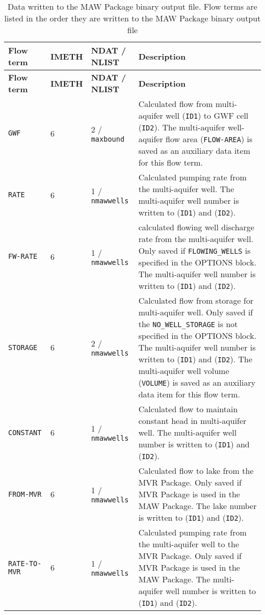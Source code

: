 \newpage
\begin{longtable}{p{3.5cm} p{2cm} p{3.5cm} p{6.5cm}}
\caption{Data written to the MAW Package binary output file. Flow terms are listed in the order they are written to the MAW Package binary output file} \tabularnewline
\hline
\hline
\textbf{Flow term} & \textbf{IMETH} & \textbf{NDAT / NLIST} & \textbf{Description} \\
\hline
\endfirsthead

\hline
\hline
\textbf{Flow term} & \textbf{IMETH} & \textbf{NDAT / NLIST} & \textbf{Description} \\
\hline
\endhead

\hline
\endfoot

\texttt{GWF} & 6 & 2 / \texttt{maxbound} & Calculated flow from multi-aquifer well (\texttt{ID1}) to GWF cell (\texttt{ID2}). The multi-aquifer well-aquifer flow area (\texttt{FLOW-AREA}) is saved as an auxiliary data item for this flow term.\\
\texttt{RATE} & 6 & 1 / \texttt{nmawwells} & Calculated pumping rate from the multi-aquifer well. The multi-aquifer well number is written to (\texttt{ID1}) and (\texttt{ID2}). \\
\texttt{FW-RATE} & 6 & 1 / \texttt{nmawwells} & calculated flowing well discharge rate from the multi-aquifer well. Only saved if \texttt{FLOWING\_WELLS} is specified in the OPTIONS block. The multi-aquifer well number is written to (\texttt{ID1}) and (\texttt{ID2}). \\
\texttt{STORAGE} & 6 & 2 / \texttt{nmawwells} & Calculated flow from storage for multi-aquifer well. Only saved if the \texttt{NO\_WELL\_STORAGE} is not specified in the OPTIONS block. The multi-aquifer well number is written to (\texttt{ID1}) and (\texttt{ID2}). The multi-aquifer well volume (\texttt{VOLUME}) is saved as an auxiliary data item for this flow term. \\
\texttt{CONSTANT} & 6 & 1 / \texttt{nmawwells} & Calculated flow to maintain constant head in multi-aquifer well. The multi-aquifer well number is written to (\texttt{ID1}) and (\texttt{ID2}). \\
\texttt{FROM-MVR} & 6 & 1 / \texttt{nmawwells} & Calculated flow to lake from the MVR Package. Only saved if MVR Package is used in the MAW Package. The lake number is written to (\texttt{ID1}) and (\texttt{ID2}). \\
\texttt{RATE-TO-MVR} & 6 & 1 / \texttt{nmawwells} & Calculated pumping rate from the multi-aquifer well to the MVR Package. Only saved if MVR Package is used in the MAW Package. The multi-aquifer well number is written to (\texttt{ID1}) and (\texttt{ID2}). \\

\end{longtable}
